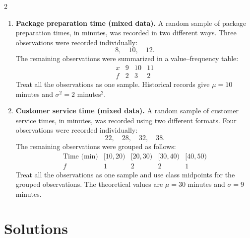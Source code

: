 \begin{multicols}{2}
\begin{enumerate}[
			leftmargin=*,
			itemsep=7pt,
			parsep=0pt,
			topsep=4pt
			]
			\item
			\textbf{Package preparation time (mixed data).}
			A random sample of package preparation times, in minutes, was recorded in
			two different ways. Three observations were recorded individually:
			\[
			8,\quad 10,\quad 12.
			\]
			The remaining observations were summarized in a value--frequency table:
			\[
			\begin{array}{c|ccc}
				x & 9 & 10 & 11\\ \hline
				f & 2 & 3 & 2
			\end{array}
			\]
			Treat all the observations as one sample. Historical records give
			$\mu=10$ minutes and $\sigma^2=2$ minutes$^2$.
			
			\item
			\textbf{Customer service time (mixed data).}
			A random sample of customer service times, in minutes, was recorded using
			two different formats. Four observations were recorded individually:
			\[
			22,\quad 28,\quad 32,\quad 38.
			\]
			The remaining observations were grouped as follows:
			\[
			\begin{array}{c|cccc}
				\text{Time (min)} & [10,20) & [20,30) & [30,40) & [40,50)\\ \hline
				f & 1 & 2 & 2 & 1
			\end{array}
			\]
			Treat all the observations as one sample and use class midpoints for the
			grouped observations. The theoretical values are $\mu=30$ minutes and
			$\sigma=9$ minutes.
			
		\end{enumerate}
	\end{multicols}
	
	
	\newpage
	\restoregeometry
	\vspace*{-15mm}
	
	\section{Solutions}
	
